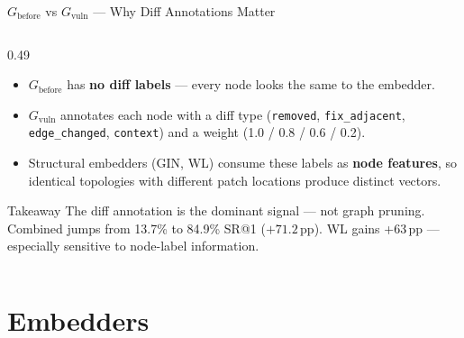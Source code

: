 \documentclass[aspectratio=169,10pt]{beamer}
\begin{document}
\begin{frame}[fragile]{$G_{\text{before}}$ vs $G_{\text{vuln}}$ — Why Diff Annotations Matter}
\begin{columns}[T]
\begin{column}{0.49\textwidth}
  \vspace{0.3em}
  \begin{itemize}\setlength{\itemsep}{2pt}
    \item $G_{\text{before}}$ has \textbf{no diff labels} —
          every node looks the same to the embedder.
    \item $G_{\text{vuln}}$ annotates each node with a diff type
          (\texttt{removed}, \texttt{fix\_adjacent},
          \texttt{edge\_changed}, \texttt{context}) and a weight
          (1.0 / 0.8 / 0.6 / 0.2).
    \item Structural embedders (GIN, WL) consume these labels as
          \textbf{node features}, so identical topologies with
          different patch locations produce distinct vectors.
  \end{itemize}

  \vspace{0.3em}
  \begin{block}{Takeaway}
    \scriptsize
    The diff annotation is the dominant signal — not graph pruning.
    Combined jumps from 13.7\% to 84.9\% SR@1 ($\mathbf{+71.2}$\,pp).
    WL gains +63\,pp — especially sensitive to node-label information.
  \end{block}

\end{column}
\end{columns}
\end{frame}



\section{Embedders}
\end{document}
